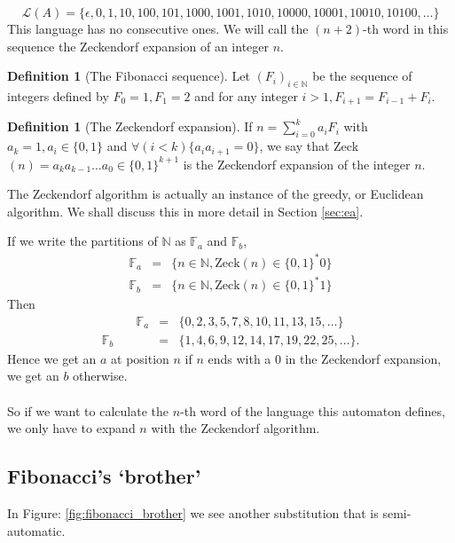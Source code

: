\documentclass{article}
\theoremstyle{definition}
\newtheorem{definition}[theorem]{Definition}
\begin{document}
\begin{displaymath}
\mathcal{L}(A) = \{\epsilon, 0, 1, 10, 100, 101, 1000, 1001, 1010, 10000, 
10001, 10010, 10100, \ldots\}
\end{displaymath}
This language has no consecutive ones. We will call the $(n + 2)$-th word in 
this sequence the Zeckendorf expansion of an integer $n$.

\begin{definition}[The Fibonacci sequence]
Let $(F_i)_{i \in \mathbb{N}}$ be the sequence of integers defined by $F_0 = 1,
F_1 = 2$ and for any integer $i > 1, F_{i + 1} = F_{i - 1} + F_i$.
\end{definition}

\begin{definition}[The Zeckendorf expansion]
If $n = \sum_{i = 0}^k a_i F_i$ with $a_k = 1, a_i \in \{0, 1\}$ and
$\forall (i < k) \{a_i a_{i + 1} = 0\}$, we say that
Zeck$(n) = a_k a_{k - 1} \ldots a_0 \in \{0, 1\}^{k + 1}$ is the Zeckendorf
expansion of the integer $n$.
\end{definition}

The Zeckendorf algorithm is actually an instance of the greedy, or Euclidean
algorithm. We shall discuss this in more detail in Section \ref{sec:ea}.

If we write the partitions of
$\mathbb{N}$ as $\mathbb{F}_a$ and $\mathbb{F}_b$,
\begin{eqnarray*}
  \mathbb{F}_a &=& \{n \in \mathbb{N}, \mathrm{Zeck}(n) \in \{0, 1\}^* 0\}\\
  \mathbb{F}_b &=& \{n \in \mathbb{N}, \mathrm{Zeck}(n) \in \{0, 1\}^* 1\}
\end{eqnarray*}
Then
\begin{eqnarray*}
\;\;\;\;\;\;\;\;\;\;
  \mathbb{F}_a &=& \{0, 2, 3, 5, 7, 8, 10, 11, 13, 15, \ldots\}\\
  \mathbb{F}_b &=& \{1, 4, 6, 9, 12, 14, 17, 19, 22, 25, \ldots\}.
\end{eqnarray*}
Hence we get an $a$ at position $n$ if $n$ ends with a 0 in the
Zeckendorf expansion, we get an $b$ otherwise.\\
\\
So if we want to calculate the $n$-th word of the language this automaton 
defines, we only have to expand $n$ with the Zeckendorf algorithm.

\subsection{Fibonacci's `brother'}
In Figure: \ref{fig:fibonacci_brother} we see another substitution that is 
semi-automatic.
\end{document}
